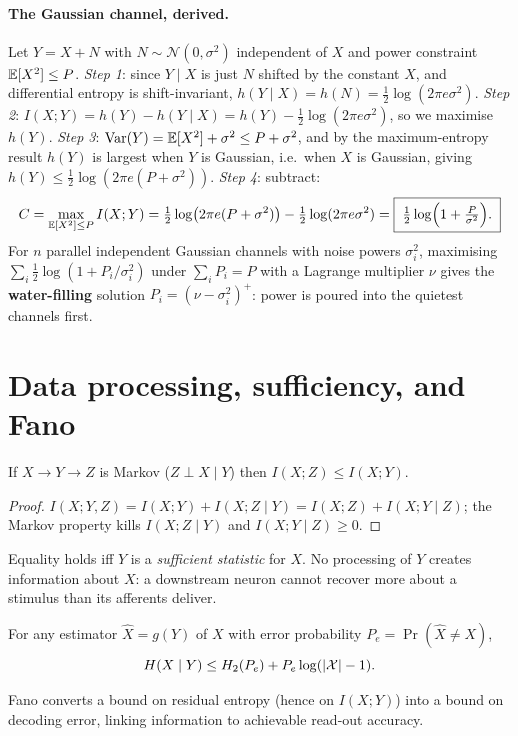 \documentclass[11pt]{article}
\begin{document}
\paragraph{The Gaussian channel, derived.}
Let $Y=X+N$ with $N\sim\mathcal N(0,\sigma^2)$ independent of $X$ and power constraint
$\mathbb{E}[X^2]\le P$. \emph{Step 1}: since $Y\mid X$ is just $N$ shifted by the constant $X$, and
differential entropy is shift-invariant, $h(Y\mid X)=h(N)=\tfrac12\log(2\pi e\sigma^2)$. \emph{Step
2}: $I(X;Y)=h(Y)-h(Y\mid X)=h(Y)-\tfrac12\log(2\pi e\sigma^2)$, so we maximise $h(Y)$. \emph{Step
3}: $\operatorname{Var}(Y)=\mathbb{E}[X^2]+\sigma^2\le P+\sigma^2$, and by the maximum-entropy result $h(Y)$ is largest
when $Y$ is Gaussian, i.e.\ when $X$ is Gaussian, giving $h(Y)\le\tfrac12\log(2\pi e(P+\sigma^2))$.
\emph{Step 4}: subtract:
\begin{equation}
  C=\max_{\mathbb{E}[X^2]\le P} I(X;Y)
   =\tfrac12\log\!\big(2\pi e(P+\sigma^2)\big)-\tfrac12\log(2\pi e\sigma^2)
   =\boxed{\;\tfrac12\log\!\Big(1+\tfrac{P}{\sigma^2}\Big).\;}
\end{equation}
For $n$ parallel independent Gaussian channels with noise powers $\sigma_i^2$, maximising
$\sum_i\tfrac12\log(1+P_i/\sigma_i^2)$ under $\sum_iP_i=P$ with a Lagrange multiplier $\nu$ gives the
\textbf{water-filling} solution $P_i=(\nu-\sigma_i^2)^+$: power is poured into the quietest channels
first.

\section{Data processing, sufficiency, and Fano}
\begin{theorem}
If $X\to Y\to Z$ is Markov ($Z\perp X\mid Y$) then $I(X;Z)\le I(X;Y)$.
\end{theorem}
\begin{proof}
$I(X;Y,Z)=I(X;Y)+I(X;Z\mid Y)=I(X;Z)+I(X;Y\mid Z)$; the Markov property kills $I(X;Z\mid Y)$ and
$I(X;Y\mid Z)\ge0$.
\end{proof}
Equality holds iff $Y$ is a \emph{sufficient statistic} for $X$. No processing of $Y$ creates
information about $X$: a downstream neuron cannot recover more about a stimulus than its afferents
deliver.

\begin{theorem}
For any estimator $\hat X=g(Y)$ of $X$ with error probability $P_e=\Pr(\hat X\neq X)$,
\begin{equation}
  H(X\mid Y)\le H_2(P_e)+P_e\log(\lvert\mathcal X\rvert-1).
\end{equation}
\end{theorem}
Fano converts a bound on residual entropy (hence on $I(X;Y)$) into a bound on decoding error,
linking information to achievable read-out accuracy.
\end{document}

